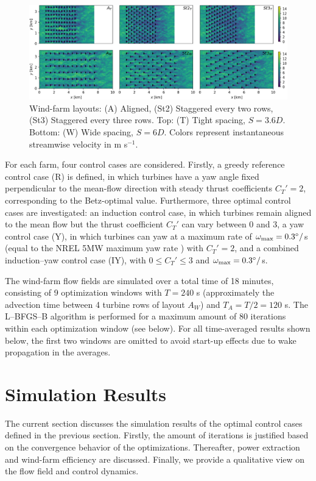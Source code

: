 \documentclass[a4paper]{jpconf}
\begin{document}
\begin{figure}
	\includegraphics[width=\textwidth]{Torque18/eps/drawing.eps}
	\caption{Wind-farm layouts: (A) Aligned, (St2) Staggered every two rows, (St3) Staggered every three rows. Top: (T) Tight spacing, $S= 3.6D$. Bottom: (W) Wide spacing, $S = 6D$. Colors represent instantaneous streamwise velocity in m s$^{-1}$.\label{fig:wf_layouts}}
\end{figure}


For each farm, four control cases are considered. Firstly, a greedy reference control case (R) is defined, in which turbines have a yaw angle fixed perpendicular to
the mean-flow direction with steady thrust coefficients $C_T' = 2$, corresponding to the Betz-optimal value. Furthermore, three optimal control cases
are investigated: an induction control case, in which turbines remain aligned to the mean flow but the thrust coefficient $C_T'$ can vary between 0
and 3, a yaw control case (Y), in which turbines can yaw at a maximum rate of $\omega_{\rm max} = 0.3^\circ /$s (equal to the NREL 5MW maximum yaw
rate \cite{jonkman}) with $C_T' = 2$, and a combined induction--yaw control case (IY), with $0 \leq C_T' \leq 3$ and $\omega_{\rm max} = 0.3^\circ/$s. 

The wind-farm flow fields are simulated over a total time of 18 minutes, consisting of 9 optimization windows with $T = 240$ s (approximately the advection time between 4 turbine rows of layout $A_W$) and $T_A = T/2 = 120$ s.
The {L--BFGS--B} algorithm is performed for a maximum amount of 80 iterations within each optimization window (see below). For all time-averaged results shown below, the first two windows are omitted to avoid start-up effects due to wake propagation in the averages.

\section{Simulation Results}\label{sec:results}
The current section discusses the simulation results of the optimal control cases defined in the previous section. Firstly, the amount of iterations is justified based on the convergence behavior of the optimizations. Thereafter, power extraction and wind-farm efficiency are
discussed. Finally, we provide a qualitative view on the flow field and control dynamics. 
\end{document}

